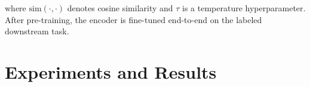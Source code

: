 \documentclass[conference]{IEEEtran}
\begin{document}
where $\mathrm{sim}(\cdot,\cdot)$ denotes cosine similarity and $\tau$ is a temperature hyperparameter. After pre-training, the encoder is fine-tuned end-to-end on the labeled downstream task.


\section{Experiments and Results}

\end{document}
